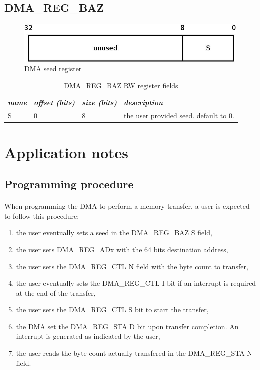 \documentclass[a4paper, 11pt]{article}
\begin{document}
\newpage
\subsection{DMA\_REG\_BAZ}

\begin{figure}[!h]
\begin{center}
\includegraphics[scale=0.20]{../pic/dma_reg_baz/main.jpeg}
\end{center}
\caption{\tiny{DMA seed register}}
\label{dma_reg_baz}
\end{figure}

\begin{table}[!h]
\centering
\begin{scriptsize}
\begin{tabular}{|p{1cm}|p{1.5cm}|p{1.5cm}|p{10cm}|}
  \hline
  \textit{name} & \textit{offset (bits)} & \textit{size (bits)} & \textit{description} \\
  \hline
  S
  &
  0
  &
  8
  &
  the user provided seed. default to 0. \\
  \hline
\end{tabular}
\end{scriptsize}
\caption{\tiny{DMA\_REG\_BAZ RW register fields}}
\label{tab:dma_reg_baz_fields}
\end{table}


\newpage
\section{Application notes}

\subsection{Programming procedure}
\paragraph{}
When programming the DMA to perform a memory transfer, a user is expected to
follow this procedure:
\begin{enumerate}
\item the user eventually sets a seed in the DMA\_REG\_BAZ S field,
\item the user sets DMA\_REG\_ADx with the 64 bits destination address,
\item the user sets the DMA\_REG\_CTL N field with the byte count to transfer,
\item the user eventually sets the DMA\_REG\_CTL I bit if an interrupt is
required at the end of the transfer,
\item the user sets the DMA\_REG\_CTL S bit to start the transfer,
\item the DMA set the DMA\_REG\_STA D bit upon transfer completion. An interrupt
is generated as indicated by the user,
\item the user reads the byte count actually transfered in the DMA\_REG\_STA
N field.
\end{enumerate}
\end{document}
